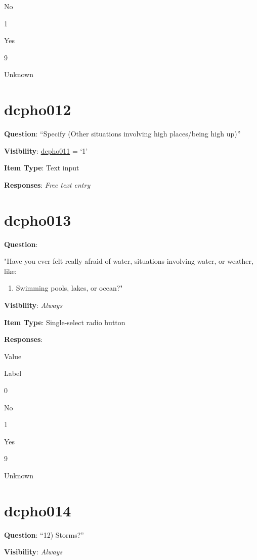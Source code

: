 \documentclass[]{book}
\providecommand{\tightlist}{%
  \setlength{\itemsep}{0pt}\setlength{\parskip}{0pt}}
\begin{document}
No

1

Yes

9

Unknown

\hypertarget{dcpho012}{%
\section{dcpho012}\label{dcpho012}}

\textbf{Question}: ``Specify (Other situations involving high places/being high up)''

\textbf{Visibility}: \protect\hyperlink{dcpho011}{dcpho011} = `1'

\textbf{Item Type}: Text input

\textbf{Responses}: \emph{Free text entry}

\hypertarget{dcpho013}{%
\section{dcpho013}\label{dcpho013}}

\textbf{Question}:

"Have you ever felt really afraid of water, situations involving water, or weather, like:

\begin{enumerate}
\def\labelenumi{\arabic{enumi})}
\setcounter{enumi}{10}
\tightlist
\item
  Swimming pools, lakes, or ocean?"
\end{enumerate}

\textbf{Visibility}: \emph{Always}

\textbf{Item Type}: Single-select radio button

\textbf{Responses}:

Value

Label

0

No

1

Yes

9

Unknown

\hypertarget{dcpho014}{%
\section{dcpho014}\label{dcpho014}}

\textbf{Question}: ``12) Storms?''

\textbf{Visibility}: \emph{Always}
\end{document}
